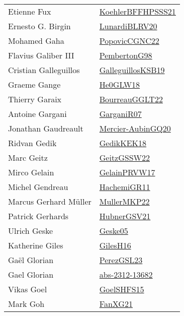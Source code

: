{\begin{longtable}{p{4cm}p{20cm}}
Etienne Fux & \href{articles/KoehlerBFFHPSSS21.pdf}{KoehlerBFFHPSSS21}\cite{KoehlerBFFHPSSS21} \\
Ernesto G. Birgin & \href{articles/LunardiBLRV20.pdf}{LunardiBLRV20}\cite{LunardiBLRV20} \\
Mohamed Gaha & \href{papers/PopovicCGNC22.pdf}{PopovicCGNC22}\cite{PopovicCGNC22} \\
Flavius Galiber III & \href{papers/PembertonG98.pdf}{PembertonG98}\cite{PembertonG98} \\
Cristian Galleguillos & \href{papers/GalleguillosKSB19.pdf}{GalleguillosKSB19}\cite{GalleguillosKSB19} \\
Graeme Gange & \href{papers/He0GLW18.pdf}{He0GLW18}\cite{He0GLW18} \\
Thierry Garaix & \href{articles/BourreauGGLT22.pdf}{BourreauGGLT22}\cite{BourreauGGLT22} \\
Antoine Gargani & \href{papers/GarganiR07.pdf}{GarganiR07}\cite{GarganiR07} \\
Jonathan Gaudreault & \href{papers/Mercier-AubinGQ20.pdf}{Mercier-AubinGQ20}\cite{Mercier-AubinGQ20} \\
Ridvan Gedik & \href{articles/GedikKEK18.pdf}{GedikKEK18}\cite{GedikKEK18} \\
Marc Geitz & \href{papers/GeitzGSSW22.pdf}{GeitzGSSW22}\cite{GeitzGSSW22} \\
Mirco Gelain & \href{papers/GelainPRVW17.pdf}{GelainPRVW17}\cite{GelainPRVW17} \\
Michel Gendreau & \href{articles/HachemiGR11.pdf}{HachemiGR11}\cite{HachemiGR11} \\
Marcus Gerhard M{\"{u}}ller & \href{articles/MullerMKP22.pdf}{MullerMKP22}\cite{MullerMKP22} \\
Patrick Gerhards & \href{articles/HubnerGSV21.pdf}{HubnerGSV21}\cite{HubnerGSV21} \\
Ulrich Geske & \href{papers/Geske05.pdf}{Geske05}\cite{Geske05} \\
Katherine Giles & \href{papers/GilesH16.pdf}{GilesH16}\cite{GilesH16} \\
Ga{\"{e}}l Glorian & \href{papers/PerezGSL23.pdf}{PerezGSL23}\cite{PerezGSL23} \\
Gael Glorian & \href{articles/abs-2312-13682.pdf}{abs-2312-13682}\cite{abs-2312-13682} \\
Vikas Goel & \href{articles/GoelSHFS15.pdf}{GoelSHFS15}\cite{GoelSHFS15} \\
Mark Goh & \href{articles/FanXG21.pdf}{FanXG21}\cite{FanXG21} \\

\end{longtable}}
